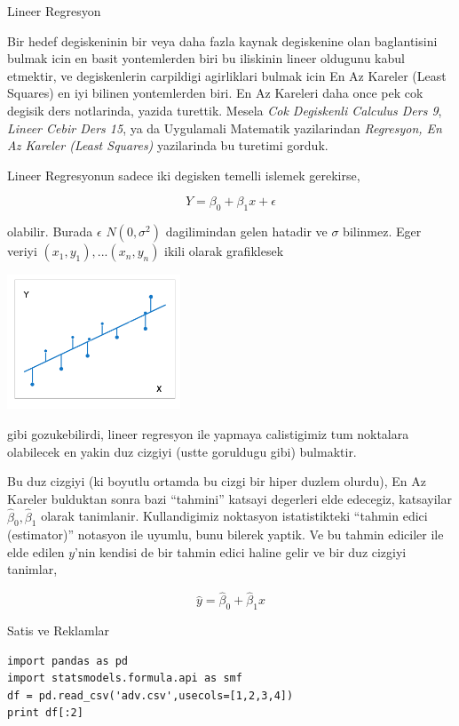 \documentclass[12pt,fleqn]{article}\usepackage{../common}
\begin{document}
Lineer Regresyon

Bir hedef degiskeninin bir veya daha fazla kaynak degiskenine olan
baglantisini bulmak icin en basit yontemlerden biri bu iliskinin lineer
oldugunu kabul etmektir, ve degiskenlerin carpildigi agirliklari bulmak
icin En Az Kareler (Least Squares) en iyi bilinen yontemlerden biri. En Az
Kareleri daha once pek cok degisik ders notlarinda, yazida turettik. Mesela
{\em Cok Degiskenli Calculus Ders 9}, {\em Lineer Cebir Ders 15}, ya da
Uygulamali Matematik yazilarindan {\em Regresyon, En Az Kareler (Least
  Squares)} yazilarinda bu turetimi gorduk. 

Lineer Regresyonun sadece iki degisken temelli islemek gerekirse, 

$$ Y = \beta_0 + \beta_1 x + \epsilon$$

olabilir. Burada $\epsilon$ $N(0,\sigma^2)$ dagilimindan gelen hatadir ve
$\sigma$ bilinmez. Eger veriyi $(x_1,y_1),...(x_n,y_n)$ ikili olarak
grafiklesek 

\includegraphics[height=4cm]{lin_01.png}

gibi gozukebilirdi, lineer regresyon ile yapmaya calistigimiz tum noktalara
olabilecek en yakin duz cizgiyi (ustte goruldugu gibi) bulmaktir. 

Bu duz cizgiyi (ki boyutlu ortamda bu cizgi bir hiper duzlem olurdu), En Az
Kareler bulduktan sonra bazi ``tahmini'' katsayi degerleri elde edecegiz,
katsayilar $\hat{\beta}_0,\hat{\beta}_1$ olarak tanimlanir. Kullandigimiz
noktasyon istatistikteki ``tahmin edici (estimator)'' notasyon ile uyumlu,
bunu bilerek yaptik. Ve bu tahmin ediciler ile elde edilen $y$'nin kendisi
de bir tahmin edici haline gelir ve bir duz cizgiyi tanimlar,

$$ \hat{y} = \hat{\beta}_0 + \hat{\beta}_1x $$


Satis ve Reklamlar

\begin{verbatim}
import pandas as pd
import statsmodels.formula.api as smf
df = pd.read_csv('adv.csv',usecols=[1,2,3,4])
print df[:2]
\end{verbatim}
\end{document}
